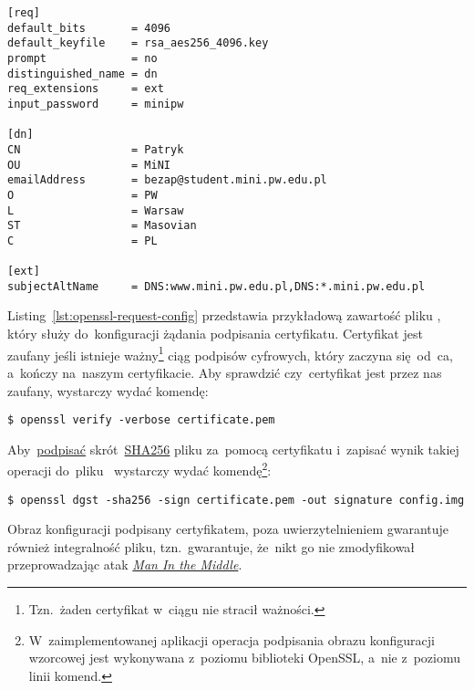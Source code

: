 \documentclass[thesis]{subfiles}
\begin{document}
\begin{lstlisting}[numbers=none,caption={Plik z~konfiguracją certyfikatu X.509},label=lst:openssl-request-config]
[req]
default_bits       = 4096
default_keyfile    = rsa_aes256_4096.key
prompt             = no
distinguished_name = dn
req_extensions     = ext
input_password     = minipw

[dn]
CN                 = Patryk
OU                 = MiNI
emailAddress       = bezap@student.mini.pw.edu.pl
O                  = PW
L                  = Warsaw
ST                 = Masovian
C                  = PL

[ext]
subjectAltName     = DNS:www.mini.pw.edu.pl,DNS:*.mini.pw.edu.pl
\end{lstlisting}

Listing~\ref{lst:openssl-request-config} przedstawia przykładową zawartość pliku , który służy do~konfiguracji żądania podpisania certyfikatu. Certyfikat jest zaufany jeśli istnieje ważny\footnote{Tzn.~żaden certyfikat w~ciągu nie stracił ważności.} ciąg podpisów cyfrowych, który zaczyna się~od~\gls{ca}, a~kończy na~naszym certyfikacie. Aby sprawdzić czy~certyfikat jest przez nas zaufany, wystarczy wydać komendę:
\begin{lstlisting}[numbers=none,frame=none]
$ openssl verify -verbose certificate.pem
\end{lstlisting}

Aby~\href{http://stackoverflow.com/questions/10782826/digital-signature-for-a-file-using-openssl}{podpisać} skrót~\href{https://en.wikipedia.org/wiki/SHA-2}{SHA256} pliku  za~pomocą certyfikatu  i~zapisać wynik takiej operacji do~pliku~ wystarczy wydać komendę\footnote{W~zaimplementowanej aplikacji operacja podpisania obrazu konfiguracji wzorcowej jest wykonywana z~poziomu biblioteki OpenSSL, a~nie z~poziomu linii komend.}:

\begin{lstlisting}[numbers=none,frame=none]
$ openssl dgst -sha256 -sign certificate.pem -out signature config.img
\end{lstlisting}

Obraz konfiguracji podpisany certyfikatem, poza uwierzytelnieniem gwarantuje również integralność pliku, tzn.~gwarantuje, że~nikt go nie zmodyfikował przeprowadzając atak \emph{\hyperlink{itm:mitm}{Man In the Middle}}.
\end{document}
